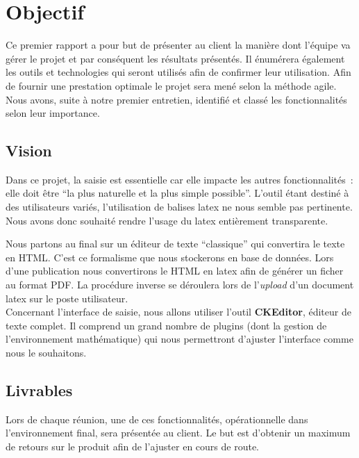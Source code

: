 %

\maketitle
\newpage
\tableofcontents
\newpage

\section{Objectif}

Ce premier rapport a pour but de présenter au client la manière dont l'équipe va gérer le projet et par conséquent les résultats présentés. Il énumérera également les outils et technologies qui seront utilisés afin de confirmer leur utilisation. Afin de fournir une prestation optimale le projet sera mené selon la méthode agile. Nous avons, suite à notre premier entretien, identifié et classé les fonctionnalités selon leur importance.

\subsection{Vision}
Dans ce projet, la saisie est essentielle car elle impacte les autres fonctionnalités~: elle doit être \enquote{la plus naturelle et la plus simple possible}.
L'outil étant destiné à des utilisateurs variés, l'utilisation de balises latex ne nous semble pas pertinente. Nous avons donc souhaité rendre l'usage du latex entièrement transparente.

Nous partons au final sur un éditeur de texte \enquote{classique} qui convertira le texte en HTML. C'est ce formalisme que nous stockerons en base de données. Lors d'une publication nous convertirons le HTML en latex afin de générer un ficher au format PDF. La procédure inverse se déroulera lors de l'\emph{upload} d'un document latex sur le poste utilisateur.\\

Concernant l'interface de saisie, nous allons utiliser l'outil \textbf{CKEditor}, éditeur de texte complet. Il comprend un grand nombre de plugins (dont la gestion de l'environnement mathématique) qui nous permettront d'ajuster l'interface comme nous le souhaitons.

\subsection{Livrables}

Lors de chaque réunion, une de ces fonctionnalités, opérationnelle dans l'environnement final, sera présentée au client. Le but est d'obtenir un maximum de retours sur le produit afin de l'ajuster en cours de route.

